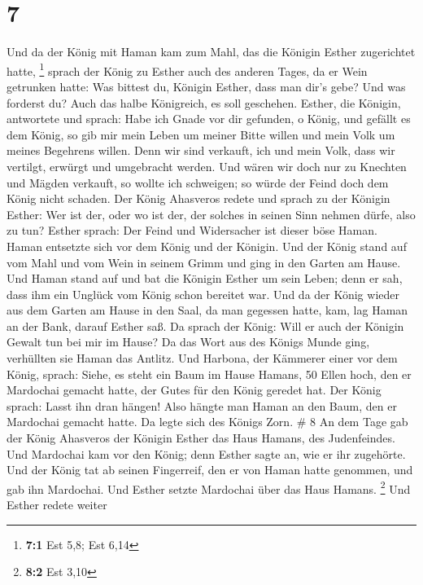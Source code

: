\hypertarget{section-2}{%
\section{7}\label{section-2}}

 Und da der König mit Haman kam zum Mahl, das die Königin
Esther zugerichtet hatte, \footnote{\textbf{7:1} Est 5,8; Est 6,14}
 sprach der König zu Esther auch des anderen Tages, da er
Wein getrunken hatte: Was bittest du, Königin Esther, dass man dir's
gebe? Und was forderst du? Auch das halbe Königreich, es soll geschehen.
 Esther, die Königin, antwortete und sprach: Habe ich
Gnade vor dir gefunden, o König, und gefällt es dem König, so gib mir
mein Leben um meiner Bitte willen und mein Volk um meines Begehrens
willen.  Denn wir sind verkauft, ich und mein Volk, dass
wir vertilgt, erwürgt und umgebracht werden. Und wären wir doch nur zu
Knechten und Mägden verkauft, so wollte ich schweigen; so würde der
Feind doch dem König nicht schaden.  Der König Ahasveros
redete und sprach zu der Königin Esther: Wer ist der, oder wo ist der,
der solches in seinen Sinn nehmen dürfe, also zu tun? 
Esther sprach: Der Feind und Widersacher ist dieser böse Haman. Haman
entsetzte sich vor dem König und der Königin.  Und der
König stand auf vom Mahl und vom Wein in seinem Grimm und ging in den
Garten am Hause. Und Haman stand auf und bat die Königin Esther um sein
Leben; denn er sah, dass ihm ein Unglück vom König schon bereitet war.
 Und da der König wieder aus dem Garten am Hause in den
Saal, da man gegessen hatte, kam, lag Haman an der Bank, darauf Esther
saß. Da sprach der König: Will er auch der Königin Gewalt tun bei mir im
Hause? Da das Wort aus des Königs Munde ging, verhüllten sie Haman das
Antlitz.  Und Harbona, der Kämmerer einer vor dem König,
sprach: Siehe, es steht ein Baum im Hause Hamans, 50 Ellen hoch, den er
Mardochai gemacht hatte, der Gutes für den König geredet hat. Der König
sprach: Lasst ihn dran hängen!  Also hängte man Haman an
den Baum, den er Mardochai gemacht hatte. Da legte sich des Königs Zorn.
\# 8  An dem Tage gab der König Ahasveros der Königin
Esther das Haus Hamans, des Judenfeindes. Und Mardochai kam vor den
König; denn Esther sagte an, wie er ihr zugehörte.  Und
der König tat ab seinen Fingerreif, den er von Haman hatte genommen, und
gab ihn Mardochai. Und Esther setzte Mardochai über das Haus Hamans.
\footnote{\textbf{8:2} Est 3,10}  Und Esther redete weiter
